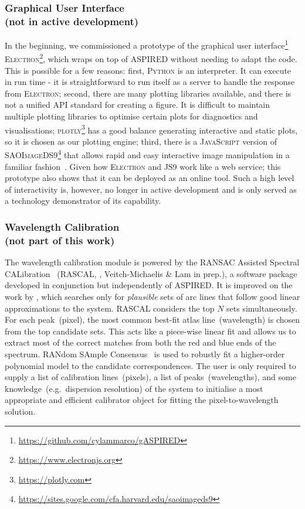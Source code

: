 \documentclass[linenumbers, twocolumn]{aastex631}
\begin{document}
\subsubsection*{Graphical User Interface\\(not in active development)}
In the beginning, we commissioned a prototype of the graphical user
interface\footnote{\url{https://github.com/cylammarco/gASPIRED}}
\textsc{Electron}\footnote{\url{https://www.electronjs.org}}, which wraps on
top of \textsc{ASPIRED} without needing to adapt the code. This is
possible for a few reasons: first, \textsc{Python} is an interpreter. It can
execute in run time - it is straightforward to run itself as a server to handle
the response from \textsc{Electron}; second, there are many plotting libraries
available, and there is not a unified API standard for creating a figure. It
is difficult to maintain multiple plotting libraries to optimise certain plots
for diagnostics and visualisations; \textsc{plotly}\footnote{\url{https://plotly.com}}
has a good balance generating interactive and static plots, so it is chosen as
our plotting engine; third, there is a \textsc{JavaScript} version of
\textsc{SAOImageDS9}\footnote{\url{https://sites.google.com/cfa.harvard.edu/saoimageds9}}
that allows rapid and easy interactive image manipulation in a familiar
fashion~\citep{2003ASPC..295..489J, eric_mandel_2022_6675771}. Given how
\textsc{Electron} and \textsc{JS9} work like a web service; this prototype also
shows that it can  be deployed as an online tool. Such a high level of
interactivity is, however, no longer in active development and is only served
as a technology demonstrator of its capability.

\subsubsection*{Wavelength Calibration\\(not part of this work)}
The wavelength calibration module is powered by the RANSAC Assisted Spectral CALibration
~(\textsc{RASCAL}, \citealt{2020zndo...4117517V, 2020ASPC..527..627V}, Veitch-Michaelis
\& Lam in prep.), a software package developed in conjunction but independently of \textsc{ASPIRED}.
It is improved on the work by \citet{2018ApOpt..57.6876S}, which searches only for
\textit{plausible} sets of arc lines that follow good linear approximations to the
system. \textsc{RASCAL} considers the top $N$ sets simultaneously. For each peak~(pixel),
the most common best-fit atlas line~(wavelength) is chosen from the top candidate
sets. This acts like a piece-wise linear fit and allows us to extract most of
the correct matches from both the red and blue ends of the spectrum. RANdom
SAmple Consensus~\citep[RANSAC,][]{fischler_bolles_1981} is used to robustly
fit a higher-order polynomial model to the candidate correspondences. The user
is only required to supply a list of calibration lines~(pixels), a
list of peaks~(wavelengths), and some knowledge~(e.g.\ dispersion resolution) of
the system to initialise a most appropriate and efficient calibrator object for
fitting the pixel-to-wavelength solution.
\end{document}
